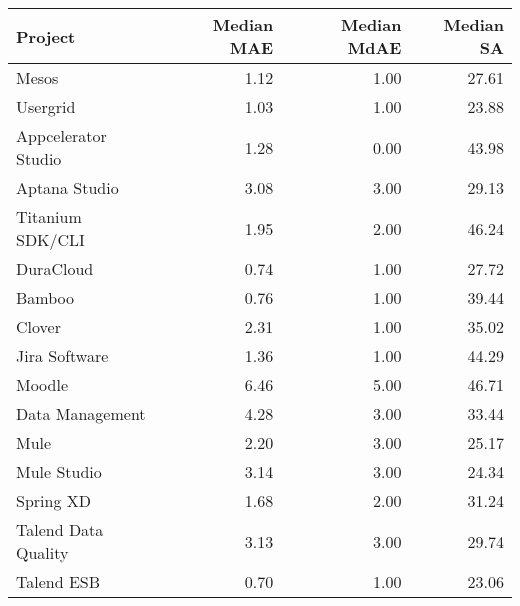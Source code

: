 \begin{tabular}{lrrr}
\toprule
             Project &  Median MAE &  Median MdAE &  Median SA \\
\midrule
               Mesos &        1.12 &         1.00 &      27.61 \\
            Usergrid &        1.03 &         1.00 &      23.88 \\
 Appcelerator Studio &        1.28 &         0.00 &      43.98 \\
       Aptana Studio &        3.08 &         3.00 &      29.13 \\
    Titanium SDK/CLI &        1.95 &         2.00 &      46.24 \\
           DuraCloud &        0.74 &         1.00 &      27.72 \\
              Bamboo &        0.76 &         1.00 &      39.44 \\
              Clover &        2.31 &         1.00 &      35.02 \\
       Jira Software &        1.36 &         1.00 &      44.29 \\
              Moodle &        6.46 &         5.00 &      46.71 \\
     Data Management &        4.28 &         3.00 &      33.44 \\
                Mule &        2.20 &         3.00 &      25.17 \\
         Mule Studio &        3.14 &         3.00 &      24.34 \\
           Spring XD &        1.68 &         2.00 &      31.24 \\
 Talend Data Quality &        3.13 &         3.00 &      29.74 \\
          Talend ESB &        0.70 &         1.00 &      23.06 \\
\bottomrule
\end{tabular}
